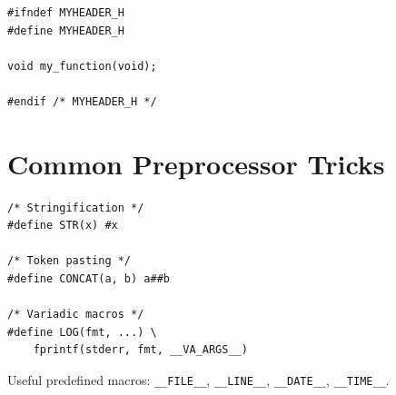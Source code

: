 \documentclass[11pt,a4paper]{article}
\begin{document}
\begin{lstlisting}
#ifndef MYHEADER_H
#define MYHEADER_H

void my_function(void);

#endif /* MYHEADER_H */
\end{lstlisting}

\section{Common Preprocessor Tricks}
\begin{lstlisting}
/* Stringification */
#define STR(x) #x

/* Token pasting */
#define CONCAT(a, b) a##b

/* Variadic macros */
#define LOG(fmt, ...) \
    fprintf(stderr, fmt, __VA_ARGS__)
\end{lstlisting}

Useful predefined macros: \texttt{\_\_FILE\_\_}, \texttt{\_\_LINE\_\_},
\texttt{\_\_DATE\_\_}, \texttt{\_\_TIME\_\_}.
\end{document}
